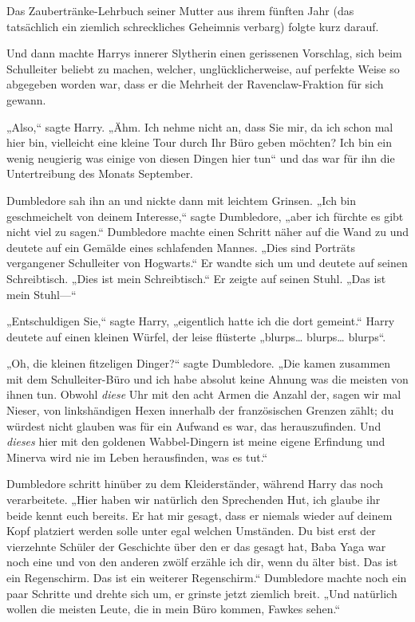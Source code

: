 {Das Zaubertränke-Lehrbuch seiner Mutter aus ihrem fünften Jahr (das tatsächlich ein ziemlich schreckliches Geheimnis verbarg) folgte kurz darauf.

Und dann machte Harrys innerer Slytherin einen gerissenen Vorschlag, sich beim Schulleiter beliebt zu machen, welcher, unglücklicherweise, auf perfekte Weise so abgegeben worden war, dass er die Mehrheit der Ravenclaw-Fraktion für sich gewann.

„Also,“ sagte Harry. „Ähm. Ich nehme nicht an, dass Sie mir, da ich schon mal hier bin, vielleicht eine kleine Tour durch Ihr Büro geben möchten? Ich bin ein wenig neugierig was einige von diesen Dingen hier tun“ und das war für ihn die Untertreibung des Monats September.

Dumbledore sah ihn an und nickte dann mit leichtem Grinsen. „Ich bin geschmeichelt von deinem Interesse,“ sagte Dumbledore, „aber ich fürchte es gibt nicht viel zu sagen.“ Dumbledore machte einen Schritt näher auf die Wand zu und deutete auf ein Gemälde eines schlafenden Mannes. „Dies sind Porträts vergangener Schulleiter von Hogwarts.“ Er wandte sich um und deutete auf seinen Schreibtisch. „Dies ist mein Schreibtisch.“ Er zeigte auf seinen Stuhl. „Das ist mein Stuhl—“

„Entschuldigen Sie,“ sagte Harry, „eigentlich hatte ich die dort gemeint.“ Harry deutete auf einen kleinen Würfel, der leise flüsterte „blurps… blurps… blurps“.

„Oh, die kleinen fitzeligen Dinger?“ sagte Dumbledore. „Die kamen zusammen mit dem Schulleiter-Büro und ich habe absolut keine Ahnung was die meisten von ihnen tun. Obwohl \emph{diese} Uhr mit den acht Armen die Anzahl der, sagen wir mal Nieser, von linkshändigen Hexen innerhalb der französischen Grenzen zählt; du würdest nicht glauben was für ein Aufwand es war, das herauszufinden. Und \emph{dieses} hier mit den goldenen Wabbel-Dingern ist meine eigene Erfindung und Minerva wird nie im Leben herausfinden, was es tut.“

Dumbledore schritt hinüber zu dem Kleiderständer, während Harry das noch verarbeitete. „Hier haben wir natürlich den Sprechenden Hut, ich glaube ihr beide kennt euch bereits. Er hat mir gesagt, dass er niemals wieder auf deinem Kopf platziert werden solle unter egal welchen Umständen. Du bist erst der vierzehnte Schüler der Geschichte über den er das gesagt hat, Baba Yaga war noch eine und von den anderen zwölf erzähle ich dir, wenn du älter bist. Das ist ein Regenschirm. Das ist ein weiterer Regenschirm.“ Dumbledore machte noch ein paar Schritte und drehte sich um, er grinste jetzt ziemlich breit. „Und natürlich wollen die meisten Leute, die in mein Büro kommen, Fawkes sehen.“

}

